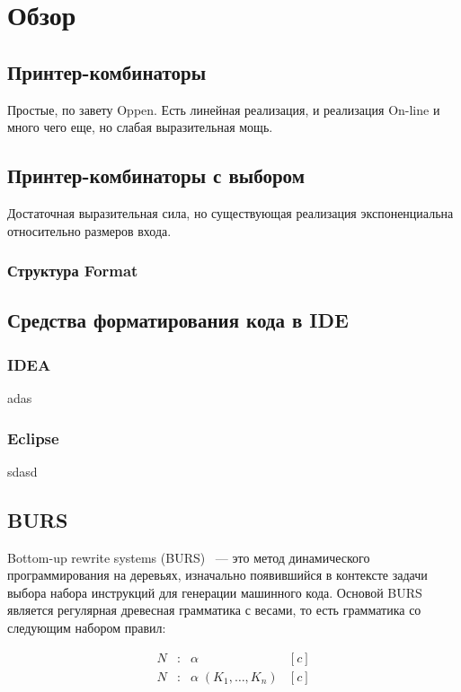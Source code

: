 \section{Обзор}

\subsection{Принтер-комбинаторы}

Простые, по завету Oppen. Есть линейная реализация, и реализация On-line и
много чего еще, но слабая выразительная мощь.

\subsection{Принтер-комбинаторы с выбором}
Достаточная выразительная сила, но существующая реализация экспоненциальна
относительно размеров входа.

\subsubsection{Структура Format}

\subsection{Средства форматирования кода в IDE}

\subsubsection{IDEA}
adas
\subsubsection{Eclipse}
sdasd

\subsection{BURS}
Bottom-up rewrite systems (BURS)~\cite{burs} --- это метод динамического
программирования на деревьях, изначально появившийся в контексте задачи выбора
набора инструкций для генерации машинного кода. Основой BURS является
регулярная древесная грамматика с весами, то есть грамматика со следующим
набором правил: 

$$
\begin{array}{rcll}
  N &:& \alpha& [c]\\
  N &:& \alpha\; (K_1,\dots,K_n)& [c]
\end{array}
$$

